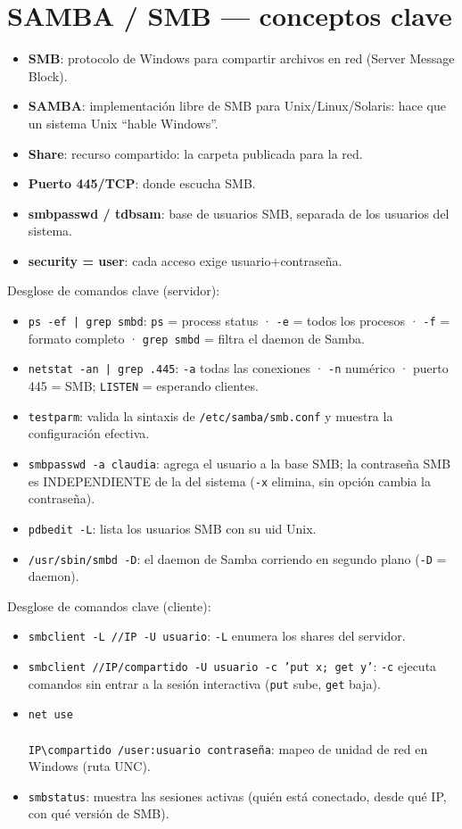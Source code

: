 \section{SAMBA / SMB --- conceptos clave}

\begin{itemize}
  \item \textbf{SMB}: protocolo de Windows para compartir archivos en red (Server Message Block).
  \item \textbf{SAMBA}: implementación libre de SMB para Unix/Linux/Solaris: hace que un sistema Unix ``hable Windows''.
  \item \textbf{Share}: recurso compartido: la carpeta publicada para la red.
  \item \textbf{Puerto 445/TCP}: donde escucha SMB.
  \item \textbf{smbpasswd / tdbsam}: base de usuarios SMB, separada de los usuarios del sistema.
  \item \textbf{security = user}: cada acceso exige usuario+contraseña.
\end{itemize}

Desglose de comandos clave (servidor):
\begin{itemize}
  \item \texttt{ps -ef | grep smbd}: \texttt{ps} = process status · \texttt{-e} = todos los procesos · \texttt{-f} = formato completo · \texttt{grep smbd} = filtra el daemon de Samba.
  \item \texttt{netstat -an | grep .445}: \texttt{-a} todas las conexiones · \texttt{-n} numérico · puerto 445 = SMB; \texttt{LISTEN} = esperando clientes.
  \item \texttt{testparm}: valida la sintaxis de \texttt{/etc/samba/smb.conf} y muestra la configuración efectiva.
  \item \texttt{smbpasswd -a claudia}: agrega el usuario a la base SMB; la contraseña SMB es INDEPENDIENTE de la del sistema (\texttt{-x} elimina, sin opción cambia la contraseña).
  \item \texttt{pdbedit -L}: lista los usuarios SMB con su uid Unix.
  \item \texttt{/usr/sbin/smbd -D}: el daemon de Samba corriendo en segundo plano (\texttt{-D} = daemon).
\end{itemize}

Desglose de comandos clave (cliente):
\begin{itemize}
  \item \texttt{smbclient -L //IP -U usuario}: \texttt{-L} enumera los shares del servidor.
  \item \texttt{smbclient //IP/compartido -U usuario -c 'put x; get y'}: \texttt{-c} ejecuta comandos sin entrar a la sesión interactiva (\texttt{put} sube, \texttt{get} baja).
  \item \texttt{net use \\\\IP\textbackslash compartido /user:usuario contraseña}: mapeo de unidad de red en Windows (ruta UNC).
  \item \texttt{smbstatus}: muestra las sesiones activas (quién está conectado, desde qué IP, con qué versión de SMB).
\end{itemize}

